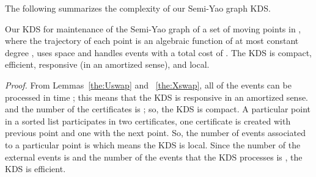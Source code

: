 \documentclass[11pt]{llncs}
\renewenvironment{proof}{\emph{Proof.}}{\hfill  \medskip\\}
\begin{document}
The following summarizes the complexity of our Semi-Yao graph KDS.
\begin{theorem}\label{the:KineticSYG}
Our KDS for maintenance of the Semi-Yao graph of a set of  moving points in , where the trajectory of each point is an algebraic function of at most constant degree , uses    space and handles  events with a total cost of . The KDS is compact, efficient, responsive (in an amortized sense), and local.
\end{theorem}
\begin{proof}
From Lemmas~\ref{the:Uswap} and ~\ref{the:Xswap}, all of the  events can be processed in time ; this means that the KDS is responsive in an amortized sense.  and the number of the certificates is ; so, the KDS is compact. A particular point in a sorted list  participates in two certificates, one certificate is created with previous point and one with the next point. So, the number of events associated to a particular point is  which means the KDS is local. Since the number of the external events is  and the number of the events that the KDS processes is , the KDS is efficient.
\end{proof}
\end{document}
